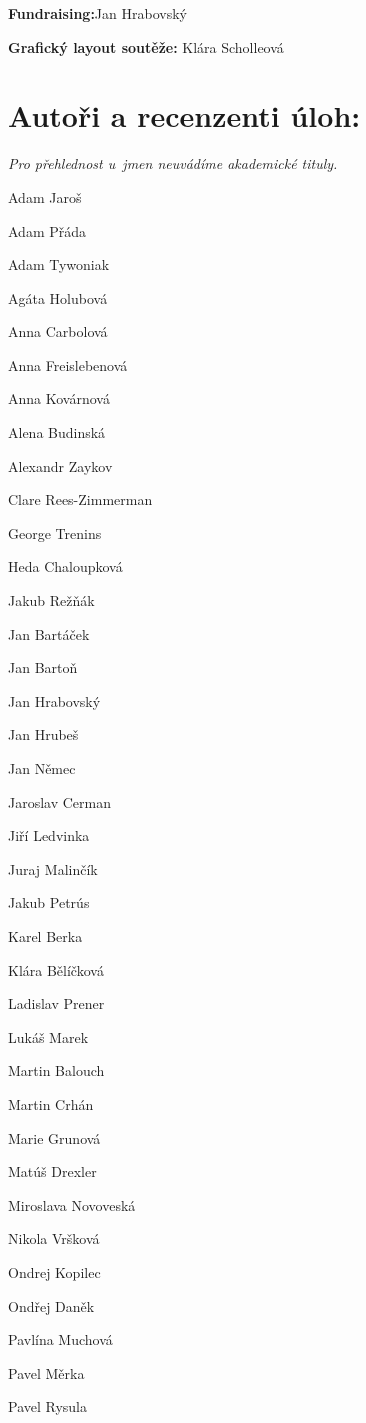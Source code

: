 \documentclass{book}
\begin{document}
\textbf{Fundraising:}\tabto{9cm}\-Jan Hrabovský

\textbf{Grafický layout soutěže:} \tabto{9cm}\-Klára Scholleová

\section*{Autoři a recenzenti úloh:}
\textit{Pro přehlednost u~jmen neuvádíme akademické tituly.}
\setlength{\columnsep}{6mm}
\begin{multicols}{3}

Adam Jaroš 

Adam Přáda 

Adam Tywoniak

Agáta Holubová

Anna Carbolová

Anna Freislebenová

Anna Kovárnová 

Alena Budinská

Alexandr Zaykov

Clare Rees-Zimmerman

George Trenins

Heda Chaloupková

Jakub Režňák

Jan Bartáček

Jan Bartoň

Jan Hrabovský

Jan Hrubeš

Jan Němec

Jaroslav Cerman

Jiří Ledvinka

Juraj Malinčík

Jakub Petrús

Karel Berka

Klára Bělíčková

Ladislav Prener

Lukáš Marek

Martin Balouch

Martin Crhán

Marie Grunová

Matúš Drexler

Miroslava Novoveská

Nikola Vršková

Ondrej Kopilec

Ondřej Daněk

Pavlína Muchová

Pavel Měrka

Pavel Rysula


\end{multicols}
\end{document}
